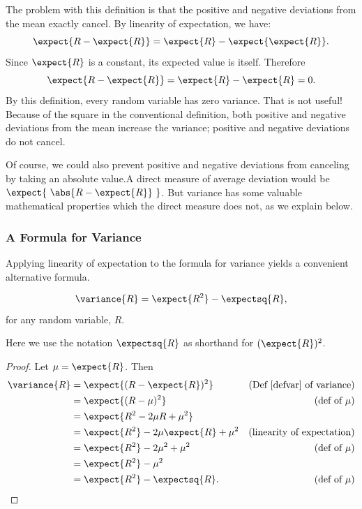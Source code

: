 The problem with this definition is that the positive and negative
deviations from the mean exactly cancel.  By linearity of expectation,
we have:
\[
  \expect{R - \expect{R}} = \expect{R} - \expect{\expect{R}}.
\]
Since $\expect{R}$ is a constant, its expected value is itself. Therefore
\[
\expect{R - \expect{R}} = \expect{R} - \expect{R} = 0.
\]
By this definition, every random variable has zero variance.  That is not
useful!  Because of the square in the conventional definition, both
positive and negative deviations from the mean increase the variance;
positive and negative deviations do not cancel.

Of course, we could also prevent positive and negative deviations from
canceling by taking an absolute value.\fi A direct measure of average
deviation would be $\expect{\ \abs{R - \expect{R}}\ }$.  But variance has
some valuable mathematical properties which the direct measure does not,
as we explain below.

\subsubsection{A Formula for Variance}

Applying linearity of expectation to the formula for variance yields a convenient
alternative formula.
\begin{theorem}\label{alt:var}
\[
\variance{R} = \expect{R^2} - \expectsq{R},
\]
for any random variable, $R$.
\end{theorem}
Here we use the notation $\expectsq{R}$ as shorthand for $(\expect{R})^2$.

\begin{proof}
Let $\mu = \expect{R}$.  Then
\begin{align*}
\variance{R} & =   \expect{(R - \expect{R})^2}
               & \text{(Def~\ref{defvar} of variance)}\\
        & = \expect{(R - \mu)^2} & \text{(def of $\mu$)}\\
        & = \expect{R^2 - 2  \mu R + \mu^2} \\
        & = \expect{R^2} - 2 \mu \expect{R} + \mu^2 
                & \text{(linearity of expectation)}\\
        & = \expect{R^2} - 2 \mu^2 + \mu^2
              &  \text{(def of $\mu$)}\\
        & = \expect{R^2} - \mu^2\\
        & = \expect{R^2} - \expectsq{R}.
                  &  \text{(def of $\mu$)}
\end{align*}
\end{proof}

